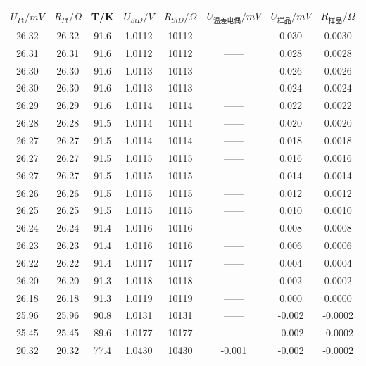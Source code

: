 \documentclass{article}
\begin{document}
    \begin{table}[htbp]
        \centering
        \begin{tabular}{cccccccc}
            \toprule
            $U_{Pt}/mV$ & $R_{Pt}/\Omega$ & T/K  & $U_{SiD}/V$ & $R_{SiD}/\Omega$ & $U_{\text{温差电偶}}/mV$ & $U_{\text{样品}}/mV$ & $R_{\text{样品}}/\Omega$ \\
            \midrule
            26.32 & 26.32  & 91.6  & 1.0112  & 10112 & ——    & 0.030  & 0.0030  \\
            26.31 & 26.31  & 91.6  & 1.0112  & 10112 & ——    & 0.028  & 0.0028  \\
            26.30  & 26.30  & 91.6  & 1.0113  & 10113 & ——    & 0.026  & 0.0026  \\
            26.30  & 26.30  & 91.6  & 1.0113  & 10113 & ——    & 0.024  & 0.0024  \\
            26.29 & 26.29  & 91.6  & 1.0114  & 10114 & ——    & 0.022  & 0.0022  \\
            26.28 & 26.28  & 91.5  & 1.0114  & 10114 & ——    & 0.020  & 0.0020  \\
            26.27 & 26.27  & 91.5  & 1.0114  & 10114 & ——    & 0.018  & 0.0018  \\
            26.27 & 26.27  & 91.5  & 1.0115  & 10115 & ——    & 0.016  & 0.0016  \\
            26.27 & 26.27  & 91.5  & 1.0115  & 10115 & ——    & 0.014  & 0.0014  \\
            26.26 & 26.26  & 91.5  & 1.0115  & 10115 & ——    & 0.012  & 0.0012  \\
            26.25 & 26.25  & 91.5  & 1.0115  & 10115 & ——    & 0.010  & 0.0010  \\
            26.24 & 26.24  & 91.4  & 1.0116  & 10116 & ——    & 0.008  & 0.0008  \\
            26.23 & 26.23  & 91.4  & 1.0116  & 10116 & ——    & 0.006  & 0.0006  \\
            26.22 & 26.22  & 91.4  & 1.0117  & 10117 & ——    & 0.004  & 0.0004  \\
            26.20  & 26.20  & 91.3  & 1.0118  & 10118 & ——    & 0.002  & 0.0002  \\
            26.18 & 26.18  & 91.3  & 1.0119  & 10119 & ——    & 0.000  & 0.0000  \\
            25.96 & 25.96  & 90.8  & 1.0131  & 10131 & ——    & -0.002  & -0.0002  \\
            25.45 & 25.45  & 89.6  & 1.0177  & 10177 & ——    & -0.002  & -0.0002  \\
            \midrule
            20.32 & 20.32  & 77.4  & 1.0430  & 10430 & -0.001 & -0.002  & -0.0002  \\
            \bottomrule
        \end{tabular}%
    \end{table}%
\end{document}
